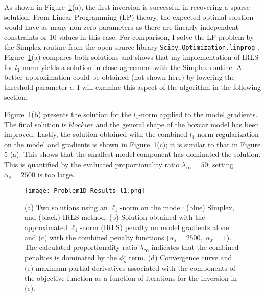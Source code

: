As shown in Figure~\ref{Problem1D_l1Result}(a), the first inversion is successful in recovering a sparse solution. From Linear Programming (LP) theory, the expected optimal solution would have as many non-zero parameters as there are linearly independent constraints or 10 values in this case. For comparison, I solve the LP problem by the Simplex routine from the open-source library \texttt{Scipy.Optimization.linprog} \cite[]{Scipy2001}. Figure~\ref{Problem1D_l1Result}(a) compares both solutions and shows that my implementation of IRLS for $l_1$-norm yields a solution in close agreement with the Simplex routine. A better approximation could be obtained (not shown here) by lowering the threshold parameter $\epsilon$. I will examine this aspect of the algorithm in the following section.

Figure~\ref{Problem1D_l1Result}(b) presents the solution for the $l_1$-norm applied to the model gradients. The final solution is $blockier$ and the general shape of the boxcar model has been improved. Lastly, the solution obtained with the combined $l_1$-norm regularization on the model and gradients is shown in Figure~\ref{Problem1D_l1Result}(c); it is similar to that in Figure 5 (a). This shows that the smallest model component has dominated the solution. This is quantified by the evaluated proportionality ratio $\lambda_\infty=50$; setting $\alpha_s=2500$ is too large.

\begin{figure}
\texttt{[image: Problem1D\_Results\_l1.png]}
\caption{(a) Two solutions using an $\ell_1$-norm on the model: (blue) Simplex, and (black) IRLS method. (b) Solution obtained with the approximated $\ell_1$-norm (IRLS) penalty on model gradients alone and (c) with the combined penalty functions ($\alpha_s=2500,\;\alpha_x = 1$). The calculated proportionality ratio $\lambda_\infty$ indicates that the combined penalties is dominated by the $\phi_s^1$ term. (d) Convergence curve and (e) maximum partial derivatives associated with the components of the objective function as a function of iterations for the inversion in (c). }
\label{Problem1D_l1Result}
\end{figure}

